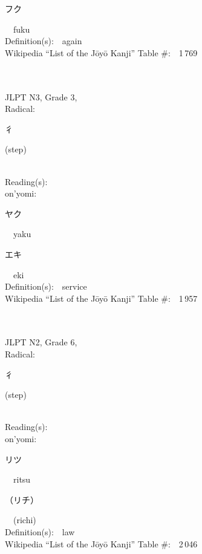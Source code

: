 \begin{multicols}{2}
{\hspace*{2em}}{\begin{CJK}{UTF8}{min} フク \end{CJK}}\ \ fuku\ \ \\
Definition(s):\ \ again \\
Wikipedia ``List of the J\=oy\=o Kanji'' Table \#:\ \ 1\,769 \\
\ \ \\
{\fontsize{34pt}{40pt}  }\ \ \\  %
{JLPT N3, Grade 3, \\Radical:\ \ {\begin{CJK}{UTF8}{min} 彳 \end{CJK}} (step) } \\
Reading(s):\ \ \\
{\hspace*{1em}}on'yomi:\ \ \\
{\hspace*{2em}}{\begin{CJK}{UTF8}{min} ヤク \end{CJK}}\ \ yaku\ \ \\
{\hspace*{2em}}{\begin{CJK}{UTF8}{min} エキ \end{CJK}}\ \ eki\ \ \\
Definition(s):\ \ service \\
Wikipedia ``List of the J\=oy\=o Kanji'' Table \#:\ \ 1\,957 \\
\ \ \\
{\fontsize{34pt}{40pt}  }\ \ \\  %
{JLPT N2, Grade 6, \\Radical:\ \ {\begin{CJK}{UTF8}{min} 彳 \end{CJK}} (step) } \\
Reading(s):\ \ \\
{\hspace*{1em}}on'yomi:\ \ \\
{\hspace*{2em}}{\begin{CJK}{UTF8}{min} リツ \end{CJK}}\ \ ritsu\ \ \\
{\hspace*{2em}}{\begin{CJK}{UTF8}{min} （リチ） \end{CJK}}\ \ (richi)\ \ \\
Definition(s):\ \ law \\
Wikipedia ``List of the J\=oy\=o Kanji'' Table \#:\ \ 2\,046 \\
\ \ \\
\end{multicols}


